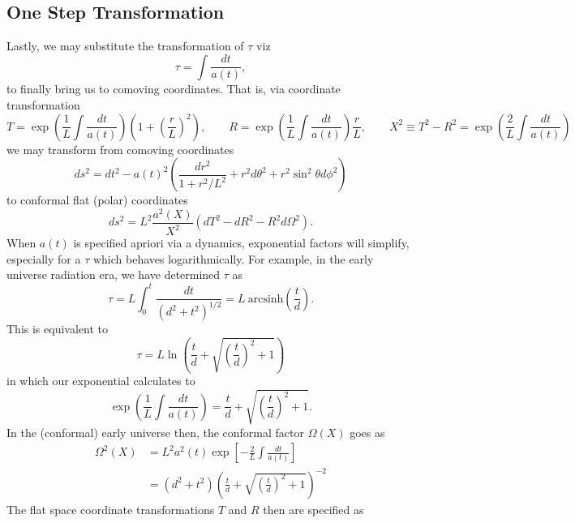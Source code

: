 \documentclass[10pt,letterpaper]{article}
\begin{document}
\subsection*{One Step Transformation}
Lastly, we may substitute the transformation of $\tau$ viz
\begin{equation}
\tau = \int\frac{dt}{a(t)},
\end{equation}
to finally bring us to comoving coordinates. That is, via coordinate transformation
\begin{equation}
T = \exp\left(\frac{1}{L}\int\frac{dt}{a(t)}\right)\left( 1+ \left(\frac{r}{L}\right)^2\right),\qquad R = \exp\left(\frac{1}{L}\int\frac{dt}{a(t)}\right)\frac{r}{L},\qquad X^2 \equiv T^2-R^2 = \exp\left(\frac{2}{L}\int\frac{dt}{a(t)}\right)
\end{equation}
we may transform from comoving coordinates 
\begin{equation}
ds^2 = dt^2 - a(t)^2 \left(  \frac{dr^2}{1+r^2/L^2} + r^2 d\theta^2 + r^2\sin^2\theta d\phi^2 \right)
\end{equation}
to conformal flat (polar) coordinates
\begin{equation}
ds^2 = L^2\frac{a^2(X)}{X^2} \left( dT^2 - dR^2 - R^2 d\Omega^2\right).
\end{equation}
When $a(t)$ is specified apriori via a dynamics, exponential factors will simplify, especially for a $\tau$ which behaves logarithmically. For example, in the early universe radiation era, we have determined $\tau$ as
\begin{equation}
\tau = L \int_0^t \frac{dt}{(d^2+t^2)^{1/2}} = L\  \text{arcsinh} \left(\frac{t}{d}\right).
\end{equation}
This is equivalent to 
\begin{equation}
\tau =L \ln \left( \frac{t}{d} + \sqrt{\left(\frac{t}{d}\right)^2 + 1}\right)
\end{equation}
in which our exponential calculates to 
\begin{equation}
\exp\left(\frac{1}{L}\int\frac{dt}{a(t)}\right) = \frac{t}{d} + \sqrt{\left(\frac{t}{d}\right)^2 + 1}.
\end{equation}
In the (conformal) early universe then, the conformal factor $\Omega(X)$ goes as
\begin{align}
\Omega^2(X) &= L^2 a^2(t) \exp\left[{-\frac{2}{L}\int\frac{dt}{a(t)}}\right] \\
&= (d^2+t^2)\left(\frac{t}{d} + \sqrt{\left(\frac{t}{d}\right)^2 + 1}\right)^{-2}
\end{align}
The flat space coordinate transformations $T$ and $R$ then are specified as
\end{document}
